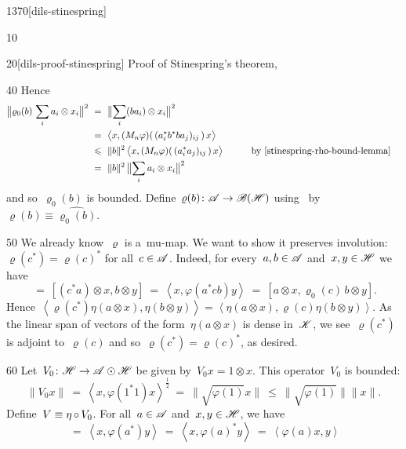 \begin{parsec}{1370}[dils-stinespring]
\begin{point}{10}
\begin{point}{20}[dils-proof-stinespring]{%
    Proof of Stinespring's theorem, }
\begin{point}{40}
Hence
\begin{alignat*}{2}
    \bigl\| \varrho_0(b) \,\sum_i a_i \otimes x_i \bigr\|^2
    & \ = \ \bigl\| \sum_i (ba_i) \otimes x_i \bigr\|^2 \\
    & \ =\  \bigl< x, (M_n\varphi)(\, (a_i^* b^*b a_j)_{ij}\,)\,x\bigr> \\
    &\ \leq\  \|b\|^2 \, \bigl< x, (M_n\varphi)(\, (a_i^* a_j)_{ij}\,) \, x\bigr>
    &\qquad& \text{by \eqref{stinespring-rho-bound-lemma}}\\
    &\ =\  \|b\|^2\, \bigl\| \sum_i a_i \otimes x_i \bigr\|^2
\end{alignat*}
and so~$\varrho_0(b)$ is bounded.
Define~$\varrho(b) \colon \scrA \to \scrB(\scrH)$
    using~
    by~$\varrho(b) \equiv \widehat{\varrho_0(b)}$.
\end{point}
\begin{point}{50}%
We already know~$\varrho$ is a~mu-map.
We want to show it preserves involution: $\varrho(c^*) = \varrho(c)^*$
for all~$c \in \scrA$.
Indeed, for every~$a,b \in \scrA$ and~$x,y \in \scrH$
    we have
    \begin{equation*}
        [\varrho_0(c^*) \, a\otimes x,b \otimes y]
        \ =\  [(c^* a)\otimes x,b \otimes y]
        \ =\  \left<x, \varphi(a^*cb) y \right>
        \ =\  [a\otimes x,\varrho_0(c)\, b \otimes y].
    \end{equation*}
Hence~$
    \left<\varrho(c^*) \eta(a\otimes x), \eta(b\otimes y)\right>=
    \left< \eta(a\otimes x), \varrho(c)\eta(b\otimes y)\right>$.
    As the linear span of vectors of the form~$\eta(a \otimes x)$
        is dense in~$\scrK$,
        we see~$\varrho(c^*)$ is adjoint to~$\varrho(c)$
        and so~$\varrho(c^*) = \varrho(c)^*$, as desired.
\end{point}
\begin{point}{60}%
    Let~$V_0 \colon \scrH \to \scrA \odot \scrH$
        be given by~$V_0 x = 1 \otimes x$.
        This operator~$V_0$ is bounded:
\begin{equation*}
        \| V_0 x\|\  =\  \left<x, \varphi(1^*1) x\right>^{\frac{1}{2}}
        \ =\  \|\sqrt{\varphi(1)} x\| \ \leq \ \|\sqrt{\varphi(1)}\| \|x\|.
\end{equation*}
    Define~$V \equiv \eta \after V_0$.
    For all~$a \in \scrA$ and~$x,y \in \scrH$, we have
\begin{equation*}
            [a \otimes x, V_0 y]
          \  =\ \left<x, \varphi(a^*)y\right>
          \  =\ \left<x, \varphi(a)^*y\right>
          \  =\ \left<\varphi(a) x, y\right>

\end{equation*}
\end{point}
\end{point}
\end{point}
\end{parsec}
